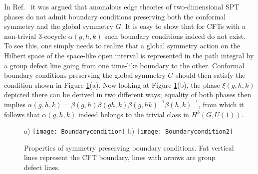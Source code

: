 \documentclass[aps,pra,twocolumn,superscriptaddress,10pt,article,nofootinbib,showpacs]{revtex4-1}
\begin{document}
In Ref.~\cite{HanTiwari} it was argued that anomalous edge theories of two-dimensional SPT phases do not admit boundary conditions preserving both the conformal symmetry and the global symmetry $G$. It is easy to show that for CFTs with a non-trivial 3-cocycle $\alpha(g,h,k)$ such boundary conditions indeed do not exist. To see this, one simply needs to realize that a global symmetry action on the Hilbert space of the space-like open interval is represented in the path integral by a group defect line going from one time-like boundary to the other. Conformal boundary conditions preserving the global symmetry $G$ should then satisfy the condition shown in Figure \ref{fig:boundary}(a). Now looking at Figure \ref{fig:boundary}(b), the phase $\xi(g,h,k)$ depicted there can be derived in two different ways; equality of both phases then implies $\alpha(g,h,k)=\beta(g,h)\beta(gh,k)\beta(g,hk)^{-1}\beta(h,k)^{-1}$, from which it follows that $\alpha(g,h,k)$ indeed belongs to the trivial class in $H^3(G,U(1))$.

\begin{figure}
a) 
\texttt{[image: Boundarycondition]}\hspace{2 mm} b)
\texttt{[image: Boundarycondition2]}
\caption{Properties of symmetry preserving boundary conditions. Fat vertical lines represent the CFT boundary, lines with arrows are group defect lines.}\label{fig:boundary}
\end{figure}
\end{document}
